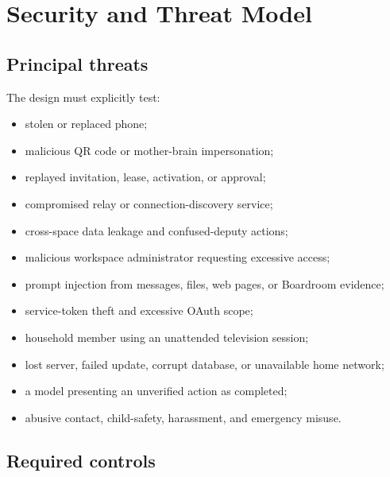 \documentclass[11pt,a4paper]{article}
\begin{document}
\section{Security and Threat Model}

\subsection{Principal threats}

The design must explicitly test:

\begin{itemize}[leftmargin=*]
  \item stolen or replaced phone;
  \item malicious QR code or mother-brain impersonation;
  \item replayed invitation, lease, activation, or approval;
  \item compromised relay or connection-discovery service;
  \item cross-space data leakage and confused-deputy actions;
  \item malicious workspace administrator requesting excessive access;
  \item prompt injection from messages, files, web pages, or Boardroom evidence;
  \item service-token theft and excessive OAuth scope;
  \item household member using an unattended television session;
  \item lost server, failed update, corrupt database, or unavailable home network;
  \item a model presenting an unverified action as completed;
  \item abusive contact, child-safety, harassment, and emergency misuse.
\end{itemize}

\subsection{Required controls}
\end{document}
